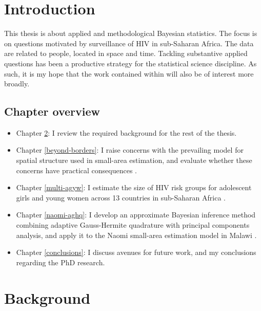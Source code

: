 \documentclass[a4paper, nobind]{templates/ociamthesis}
\providecommand{\tightlist}{%
  \setlength{\itemsep}{0pt}\setlength{\parskip}{0pt}}
\begin{document}
\hypertarget{introduction}{%
\chapter{Introduction}\label{introduction}}

\adjustmtc
{}

This thesis is about applied and methodological Bayesian statistics.
The focus is on questions motivated by surveillance of HIV in sub-Saharan Africa.
The data are related to people, located in space and time.
Tackling substantive applied questions has been a productive strategy for the statistical science discipline.
As such, it is my hope that the work contained within will also be of interest more broadly.

\hypertarget{chapter-overview}{%
\section{Chapter overview}\label{chapter-overview}}

\begin{itemize}
\tightlist
\item
  Chapter \ref{background}: I review the required background for the rest of the thesis.
\item
  Chapter \ref{beyond-borders}: I raise concerns with the prevailing model for spatial structure used in small-area estimation, and evaluate whether these concerns have practical consequences \autocite{howes2023beyond}.
\item
  Chapter \ref{multi-agyw}: I estimate the size of HIV risk groups for adolescent girls and young women across 13 countries in sub-Saharan Africa \autocite{howes2023spatio}.
\item
  Chapter \ref{naomi-aghq}: I develop an approximate Bayesian inference method combining adaptive Gauss-Hermite quadrature with principal components analysis, and apply it to the Naomi small-area estimation model in Malawi \autocite{howes2023fast}.
\item
  Chapter \ref{conclusions}: I discuss avenues for future work, and my conclusions regarding the PhD research.
\end{itemize}

\hypertarget{background}{%
\chapter{Background}\label{background}}
\end{document}

